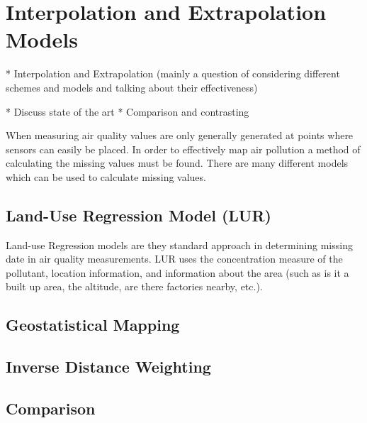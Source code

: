 \section{Interpolation and Extrapolation Models}\label{interpolation}


   * Interpolation and Extrapolation (mainly a question of considering different schemes and models and talking about their effectiveness)


      * Discuss state of the art
      * Comparison and contrasting


When measuring air quality values are only generally generated at points where sensors can easily be placed. In order to effectively map air pollution a method of calculating the missing values must be found. There are many different models which can be used to calculate missing values.


\subsection{Land-Use Regression Model (LUR)}\label{lur}

Land-use Regression models are they standard approach in determining missing date in air quality measurements. LUR uses the concentration measure of the pollutant, location information, and information about the area (such as is it a built up area, the altitude, are there factories nearby, etc.). 


\subsection{Geostatistical Mapping}\label{geostatics}


\subsection{Inverse Distance Weighting}\label{inverseweight}


\subsection{Comparison}\label{interpolationcomparison}

